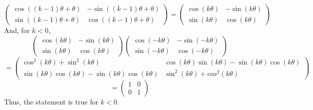 \documentclass[12pt]{article}
\begin{document}
\begin{itemize}
\begin{itemize}
$$\begin{pmatrix}
\cos((k-1)\theta + \theta) & -\sin((k-1)\theta + \theta) \\
\sin((k-1)\theta + \theta) & \cos((k-1)\theta + \theta)
\end{pmatrix} = \begin{pmatrix}
\cos(k\theta) & -\sin(k\theta) \\
\sin(k\theta) & \cos(k\theta)
\end{pmatrix}$$
\normalsize
And, for $k < 0$,
$$\begin{pmatrix}
\cos(k\theta) & -\sin(k\theta) \\
\sin(k\theta) & \cos(k\theta)
\end{pmatrix}\begin{pmatrix}
\cos(-k\theta) & -\sin(-k\theta) \\
\sin(-k\theta) & \cos(-k\theta) 
\end{pmatrix}$$
$$= \begin{pmatrix}
\cos^2(k\theta) + \sin^2(k\theta) & \cos(k\theta)\sin(k\theta) - \sin(k\theta)\cos(k\theta) \\
\sin(k\theta)\cos(k\theta) - \sin(k\theta)\cos(k\theta) & \sin^2(k\theta) + cos^2(k\theta)
\end{pmatrix}$$
$$ = \begin{pmatrix}
1 & 0 \\
0 & 1
\end{pmatrix}$$
Thus, the statement is true for $k < 0$.


\end{itemize}
\end{itemize}
\end{document}

